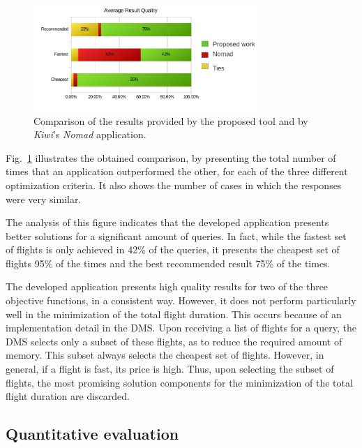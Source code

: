 \begin{figure}[h]
    \centering
    \includegraphics[width=8.5cm]{./imgs/results.png}
    \caption{Comparison of the results provided by the proposed tool and by \textit{Kiwi}'s \textit{Nomad} application.}
    \label{fig:quality_apis}
\end{figure}

Fig.~\ref{fig:quality_apis} illustrates the obtained comparison, by presenting the total number of times that an application outperformed the other, for each of the three different optimization criteria. It also shows the number of cases in which the responses were very similar.

The analysis of this figure indicates that the developed application presents better solutions for a significant amount of queries. In fact, while the fastest set of flights is only achieved in 42\% of the queries, it presents the cheapest set of flights 95\% of the times and the best recommended result 75\% of the times. 

The developed application presents high quality results for two of the three objective functions, in a consistent way. However, it does not perform particularly well in the minimization of the total flight duration. This occurs because of an implementation detail in the DMS. Upon receiving a list of flights for a query, the DMS selects only a subset of these flights, as to reduce the required amount of memory. This subset always selects the cheapest set of flights. However, in general, if a flight is fast, its price is high. Thus, upon selecting the subset of flights, the most promising solution components for the minimization of the total flight duration are discarded.







\subsection{Quantitative evaluation}
\label{sec:quantitative_eval}


